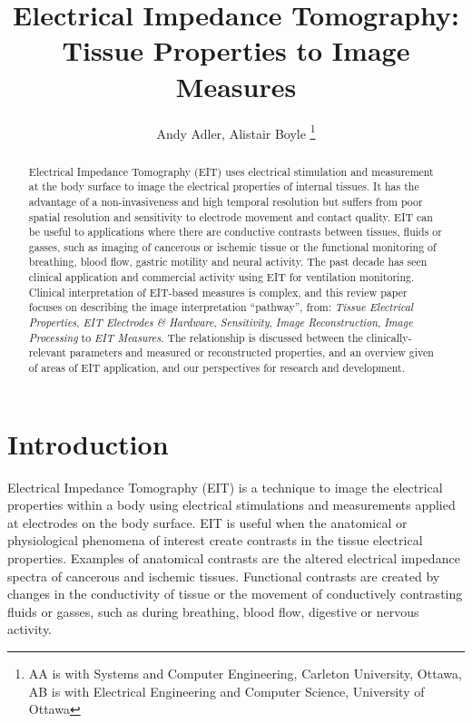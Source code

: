 \documentclass[12pt]{article} \usepackage[margin=3cm]{geometry} \usepackage[margin=20pt,font=small,labelfont=bf]{caption}\def\TBLWIDA{35mm}\def\TBLWIDB{95mm}
\begin{document}
\title{Electrical Impedance Tomography:\\ Tissue Properties to Image Measures}
\author{Andy Adler, Alistair Boyle
\thanks{AA is with Systems and Computer Engineering, Carleton University, Ottawa, AB is with Electrical Engineering and Computer Science, University of Ottawa}
}
\date{}
\maketitle

\begin{abstract}
Electrical Impedance Tomography (EIT) uses electrical
stimulation and measurement at the body surface to
image the electrical properties of internal tissues.
It has the advantage of a non-invasiveness and
high temporal resolution but suffers from poor spatial
resolution and sensitivity to electrode movement and
contact quality.
EIT can be useful to applications where there are conductive contrasts between
tissues, fluids or gasses, such as imaging of cancerous
or ischemic tissue or the functional monitoring
of breathing, blood flow, gastric motility
and neural activity.
The past decade has seen clinical application and commercial
activity using EIT for ventilation monitoring.
Clinical interpretation of EIT-based measures is complex, and
this review paper focuses on 
describing the image interpretation ``pathway'', from:
{\em Tissue Electrical Properties},
{\em EIT Electrodes \& Hardware},
{\em Sensitivity},
{\em Image Reconstruction},
{\em Image Processing}
to 
{\em EIT Measures}.
The relationship is discussed between the 
clinically-relevant parameters and measured or
reconstructed properties, and 
an overview given of areas of EIT application,
and our perspectives for
research and development.
\end{abstract}


\section{Introduction}

Electrical Impedance Tomography (EIT) is a technique to 
image the electrical properties within a body using
electrical stimulations and measurements applied at electrodes
on the body surface.
EIT is useful when the
anatomical or physiological phenomena of interest
create contrasts in the tissue electrical properties.
Examples of anatomical contrasts are 
the altered electrical impedance spectra of
cancerous \cite{Jossinet1998Breast} and
ischemic \cite{Packham2012Frequency} tissues.
Functional contrasts are created by changes
in the conductivity of tissue or the movement of
conductively contrasting fluids or gasses, such as during
breathing, blood flow, digestive or nervous activity.
\end{document}
